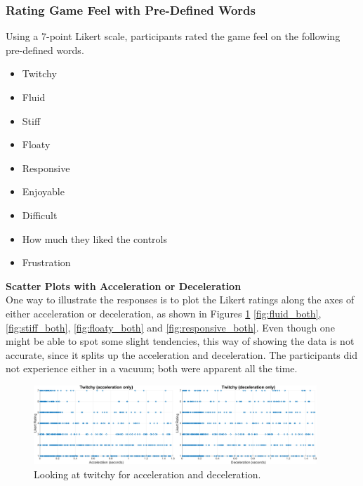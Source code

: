 \subsubsection{Rating Game Feel with Pre-Defined Words}
Using a 7-point Likert scale, participants rated the game feel on the following pre-defined words.
\begin{itemize}[noitemsep,nolistsep]
\item Twitchy
\item Fluid
\item Stiff
\item Floaty
\item Responsive
\item Enjoyable
\item Difficult
\item How much they liked the controls
\item Frustration
\end{itemize}


\textbf{Scatter Plots with Acceleration or Deceleration}\\
One way to illustrate the responses is to plot the Likert ratings along the axes of either acceleration or deceleration, as shown in Figures \ref{fig:twitchy_both} \ref{fig:fluid_both}, \ref{fig:stiff_both}, \ref{fig:floaty_both} and \ref{fig:responsive_both}. Even though one might be able to spot some slight tendencies, this way of showing the data is not accurate, since it splits up the acceleration and deceleration. The participants did not experience either in a vacuum; both were apparent all the time.

\begin{figure}[htbp]
\centering
\includegraphics[width=0.95\textwidth]{Pics/Classes/twitchy_both}
\caption{Looking at twitchy for acceleration and deceleration.}
\label{fig:twitchy_both}
\end{figure}

